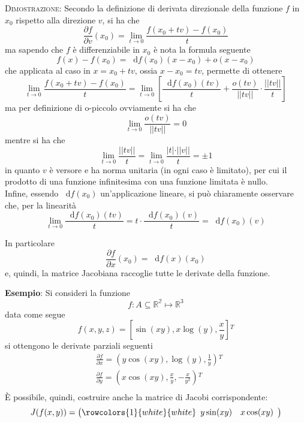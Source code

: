 \documentclass[a4paper]{extarticle}
\newcommand*\dif{\mathop{}\!\mathrm{d}}
\begin{document}
\vspace{2em}
\noindent
\normalfont \normalsize
\textsc{Dimostrazione}: Secondo la definizione di derivata direzionale della funzione $f$ in $x_0$ rispetto alla direzione $v$, si ha che
\[\frac{\partial f}{\partial v}(x_0)= \lim_{t \to 0} \frac{f(x_0+tv) - f(x_0)}{t}\]
ma sapendo che $f$ è differenziabile in $x_0$ è nota la formula seguente
\[f(x)-f(x_0) = \dif f(x_0)(x-x_0)+o(x-x_0)\]
che applicata al caso in $x=x_0+tv$, ossia $x-x_0=tv$, permette di ottenere
\[\lim_{t \to 0} \frac{f(x_0+tv) - f(x_0)}{t} = \lim_{t \to 0} \left[ \frac{\dif f(x_0) (tv)}{t} + \frac{o(t v)}{\vert \vert tv \vert \vert} \cdot \frac{\vert \vert tv \vert \vert}{t}\right]\]
ma per definizione di o-piccolo ovviamente si ha che
\[\lim_{t \to 0} \frac{o(t v)}{\vert \vert tv \vert \vert} = 0\]
mentre si ha che
\[\lim_{t \to 0} \frac{\vert \vert tv \vert \vert}{t} = \lim_{t \to 0} \frac{\vert t \vert \cdot \vert \vert v \vert \vert}{t} = \pm 1\]
in quanto $v$ è versore e ha norma unitaria (in ogni caso è limitato), per cui il prodotto di una funzione infinitesima con una funzione limitata è nullo.\\
Infine, essendo $\dif f(x_0)$ un'applicazione lineare, si può chiaramente osservare che, per la linearità
\[\lim_{t \to 0} \frac{\dif f(x_0) (tv)}{t} = t \cdot \frac{\dif f(x_0)(v)}{t} = \dif f(x_0) (v)\]

\vspace{1em}
\noindent
In particolare
\[\frac{\partial f}{\partial x}(x_0) = \dif f(x) (x_0)\]
e, quindi, la matrice Jacobiana raccoglie tutte le derivate della funzione.

\vspace{1em}
\noindent
\textbf{Esempio}: Si consideri la funzione
\[f : A \subseteq \mathbb{R^2} \longmapsto \mathbb{R}^3\]
data come segue
\[f(x,y,z)=\left[\sin(xy),x \log(y),\frac{x}{y}\right]{^T}\]
si ottengono le derivate parziali seguenti
\begin{align*}
    &\frac{\partial f}{\partial x} = \left(y\cos(xy),\log(y),\frac{1}{y}\right){^T}\\
    &\frac{\partial f}{\partial y} = \left(x\cos(xy),\frac{x}{y},-\frac{x}{y^2}\right){^T}\\
\end{align*}
È possibile, quindi, costruire anche la matrice di Jacobi corrispondente:
\[J(f(x,y)) = \left(
    \rowcolors{1}{white}{white}
    \begin{array}{cc}
        y \sin(xy) & x \cos(xy)\\
    \end{array}
\right)\]
\end{document}
